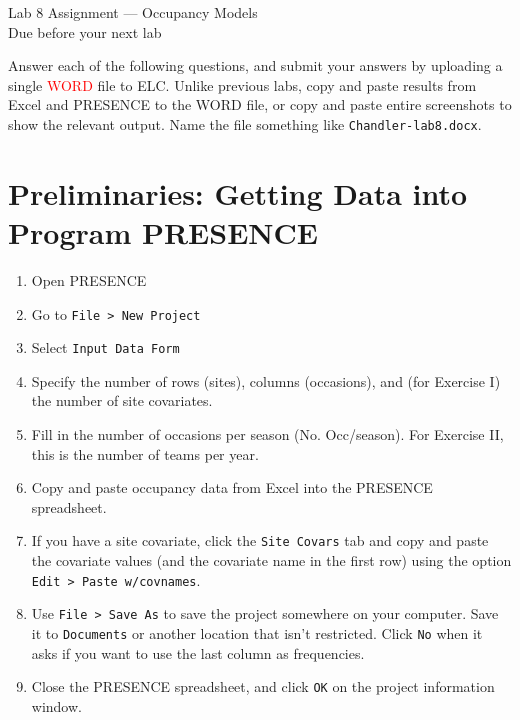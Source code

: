 \documentclass[12pt]{article}\usepackage[]{graphicx}\usepackage[]{color}
\begin{document}
{
  \Large
  \centering
  Lab 8 Assignment --- Occupancy Models \\
  Due before your next lab \par
}

\vspace{10pt}


Answer each of the following questions, and submit your answers by
uploading a single \textcolor{red}{WORD} file to ELC. Unlike previous labs,
copy and paste results from Excel and PRESENCE to the WORD file, or
copy and paste entire screenshots to show the relevant output. Name
the file something like \texttt{Chandler-lab8.docx}.  



\section*{\normalsize Preliminaries: Getting Data into Program PRESENCE}
\vspace{-10pt}
\begin{enumerate}
  \itemsep-6pt
  \item[(1)]  Open PRESENCE
  \item[(2)]  Go to \texttt{File > New Project}
  \item[(3)]  Select \texttt{Input Data Form}
  \item[(4)]  Specify the number of rows (sites), columns
    (occasions), and (for Exercise I) the number of site covariates. 
  \item[(5)]  Fill in the number of occasions per season
    (No. Occ/season). For Exercise II, this is the number of teams per
    year. 
  \item[(6)]  Copy and paste occupancy data from Excel into the
    PRESENCE spreadsheet. 
  \item[(7)]  If you have a site covariate, click the \texttt{Site
      Covars} tab and copy and paste the covariate values (and the
    covariate name in the first row) using the option \texttt{Edit > Paste
    w/covnames}.  
  \item[(8)]  Use \texttt{File > Save As} to save the project
    somewhere on your computer. Save it to \texttt{Documents} or
    another location that isn't restricted. Click \texttt{No} when it
    asks if you want to use the last column as frequencies. 
  \item[(9)]  Close the PRESENCE spreadsheet, and click \texttt{OK} on
    the project information window.  
\end{enumerate}
\end{document}
